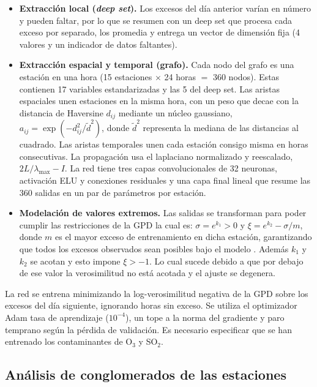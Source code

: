 \documentclass[11pt]{article}
\begin{document}
\begin{itemize}[leftmargin=*]
    \item\textbf{Extracción local (\textit{deep set}).} Los excesos del día anterior varían en número y pueden faltar, por lo que se resumen con un deep set que procesa cada exceso por separado, los promedia y entrega un vector de dimensión fija (4 valores y un indicador de datos faltantes). 
    \item\textbf{Extracción espacial y temporal (grafo).} Cada nodo del grafo es una estación en una hora (15 estaciones $\times$ 24 horas $=$ 360 nodos). Estas contienen 17 variables estandarizadas y las 5 del deep set. Las aristas espaciales unen estaciones en la misma hora, con un peso que decae con la distancia de Haversine $d_{ij}$ mediante un núcleo gaussiano,  $a_{ij} = \exp(-d_{ij}^2/\tilde{d}^2)$, donde $\tilde{d}^2$ representa la mediana de las distancias al cuadrado. Las aristas temporales unen cada estación consigo misma en horas consecutivas.  La propagación usa el laplaciano normalizado y reescalado, $2L/\lambda_{\max} - I$. La red tiene tres capas convolucionales de 32 neuronas, activación ELU y conexiones residuales y una capa final lineal que resume las 360 salidas en un par de parámetros por estación. 
    \item\textbf{Modelación de valores extremos.} Las salidas se transforman para poder cumplir las restricciones de la GPD la cual es:  $\sigma = e^{k_1} > 0$ y $\xi = e^{k_2} - \sigma/m$, donde $m$ es el mayor exceso de entrenamiento en dicha estación, garantizando que todos los excesos observados sean posibles bajo el modelo \citep{wilson2022deepgpd}. Además $k_1$ y $k_2$ se acotan y esto impone $\xi > -1$. Lo cual sucede debido a que por debajo de ese valor la verosimilitud no está acotada y el ajuste se degenera. 
\end{itemize}

La red se entrena minimizando la log-verosimilitud negativa de la GPD sobre los excesos del día siguiente, ignorando horas sin exceso. Se utiliza el optimizador Adam tasa de aprendizaje ($10^{-4}$), un tope a la norma del gradiente y paro temprano según la pérdida de validación. Es necesario especificar que se han entrenado los contaminantes de O$_3$ y SO$_2$. 

\subsection{Análisis de conglomerados de las estaciones}
\end{document}
